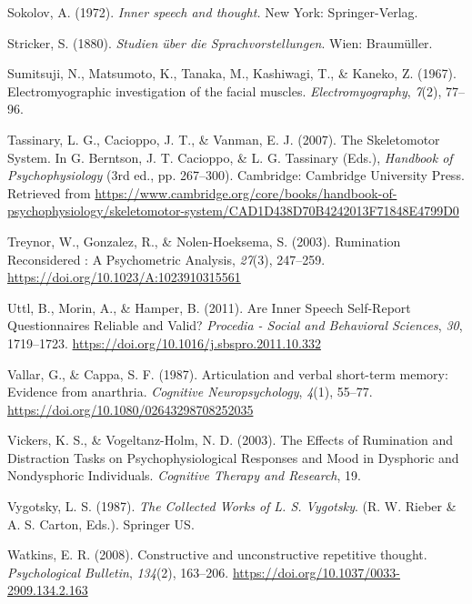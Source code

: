 \documentclass[a4paper,12pt,twoside,openright,oldfontcommands]{memoir}
\begin{document}
\hypertarget{ref-sokolov_inner_1972}{}
Sokolov, A. (1972). \emph{Inner speech and thought.} New York:
Springer-Verlag.

\hypertarget{ref-stricker_studien_1880}{}
Stricker, S. (1880). \emph{Studien über die Sprachvorstellungen}. Wien:
Braumüller.

\hypertarget{ref-sumitsuji_electromyographic_1967}{}
Sumitsuji, N., Matsumoto, K., Tanaka, M., Kashiwagi, T., \& Kaneko, Z.
(1967). Electromyographic investigation of the facial muscles.
\emph{Electromyography}, \emph{7}(2), 77--96.

\hypertarget{ref-berntson_skeletomotor_2007}{}
Tassinary, L. G., Cacioppo, J. T., \& Vanman, E. J. (2007). The
Skeletomotor System. In G. Berntson, J. T. Cacioppo, \& L. G. Tassinary
(Eds.), \emph{Handbook of Psychophysiology} (3rd ed., pp. 267--300).
Cambridge: Cambridge University Press. Retrieved from
\url{https://www.cambridge.org/core/books/handbook-of-psychophysiology/skeletomotor-system/CAD1D438D70B4242013F71848E4799D0}

\hypertarget{ref-treynor_rumination_2003}{}
Treynor, W., Gonzalez, R., \& Nolen-Hoeksema, S. (2003). Rumination
Reconsidered : A Psychometric Analysis, \emph{27}(3), 247--259.
\url{https://doi.org/10.1023/A:1023910315561}

\hypertarget{ref-Uttl2011}{}
Uttl, B., Morin, A., \& Hamper, B. (2011). Are Inner Speech Self-Report
Questionnaires Reliable and Valid? \emph{Procedia - Social and
Behavioral Sciences}, \emph{30}, 1719--1723.
\url{https://doi.org/10.1016/j.sbspro.2011.10.332}

\hypertarget{ref-vallar_articulation_1987}{}
Vallar, G., \& Cappa, S. F. (1987). Articulation and verbal short-term
memory: Evidence from anarthria. \emph{Cognitive Neuropsychology},
\emph{4}(1), 55--77. \url{https://doi.org/10.1080/02643298708252035}

\hypertarget{ref-vickers_effects_2003}{}
Vickers, K. S., \& Vogeltanz-Holm, N. D. (2003). The Effects of
Rumination and Distraction Tasks on Psychophysiological Responses and
Mood in Dysphoric and Nondysphoric Individuals. \emph{Cognitive Therapy
and Research}, 19.

\hypertarget{ref-vygotsky_collected_1987}{}
Vygotsky, L. S. (1987). \emph{The Collected Works of L. S. Vygotsky}.
(R. W. Rieber \& A. S. Carton, Eds.). Springer US.

\hypertarget{ref-Watkins2008}{}
Watkins, E. R. (2008). Constructive and unconstructive repetitive
thought. \emph{Psychological Bulletin}, \emph{134}(2), 163--206.
\url{https://doi.org/10.1037/0033-2909.134.2.163}
\end{document}
